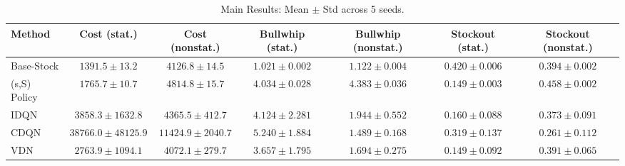 \begin{table}[ht]
\centering
\caption{Main Results: Mean $\pm$ Std across 5 seeds.}
\label{tab:main_results}
\begin{tabular}{lcccccc}
\toprule
Method & Cost (stat.) & Cost (nonstat.) & Bullwhip (stat.) & Bullwhip (nonstat.) & Stockout (stat.) & Stockout (nonstat.) \\
\midrule
Base-Stock & $1391.5 \pm 13.2$ & $4126.8 \pm 14.5$ & $1.021 \pm 0.002$ & $1.122 \pm 0.004$ & $0.420 \pm 0.006$ & $0.394 \pm 0.002$ \\
(s,S) Policy & $1765.7 \pm 10.7$ & $4814.8 \pm 15.7$ & $4.034 \pm 0.028$ & $4.383 \pm 0.036$ & $0.149 \pm 0.003$ & $0.458 \pm 0.002$ \\
IDQN & $3858.3 \pm 1632.8$ & $4365.5 \pm 412.7$ & $4.124 \pm 2.281$ & $1.944 \pm 0.552$ & $0.160 \pm 0.088$ & $0.373 \pm 0.091$ \\
CDQN & $38766.0 \pm 48125.9$ & $11424.9 \pm 2040.7$ & $5.240 \pm 1.884$ & $1.489 \pm 0.168$ & $0.319 \pm 0.137$ & $0.261 \pm 0.112$ \\
VDN & $2763.9 \pm 1094.1$ & $4072.1 \pm 279.7$ & $3.657 \pm 1.795$ & $1.694 \pm 0.275$ & $0.149 \pm 0.092$ & $0.391 \pm 0.065$ \\
\bottomrule
\end{tabular}
\end{table}
